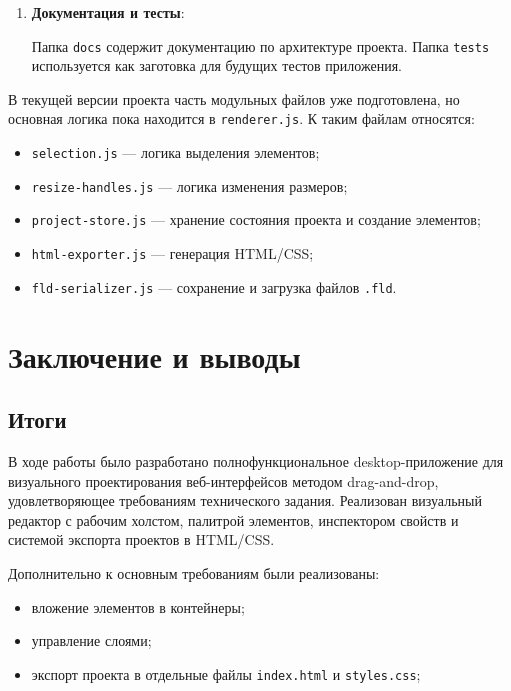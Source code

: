 \documentclass[14pt,a4paper]{extarticle}
\begin{document}
{{\begin{enumerate}
    \begin{verbatim}
{
  version: 1,
  name,
  canvas,
  elements
}
    \end{verbatim}

    При загрузке файла \texttt{.fld} элементы проходят нормализацию через функцию \texttt{normalizeElement()}. Это позволяет избежать ошибок при открытии старых сохранений после добавления новых свойств элементов.

    \item \textbf{Документация и тесты}:

    Папка \texttt{docs} содержит документацию по архитектуре проекта. Папка \texttt{tests} используется как заготовка для будущих тестов приложения.
\end{enumerate}

В текущей версии проекта часть модульных файлов уже подготовлена, но основная логика пока находится в \texttt{renderer.js}. К таким файлам относятся:

\begin{itemize}
    \item \texttt{selection.js} --- логика выделения элементов;
    \item \texttt{resize-handles.js} --- логика изменения размеров;
    \item \texttt{project-store.js} --- хранение состояния проекта и создание элементов;
    \item \texttt{html-exporter.js} --- генерация HTML/CSS;
    \item \texttt{fld-serializer.js} --- сохранение и загрузка файлов \texttt{.fld}.
\end{itemize}

\newpage
\section{Заключение и выводы}

\subsection{Итоги}

В ходе работы было разработано полнофункциональное desktop-приложение для визуального проектирования веб-интерфейсов методом drag-and-drop, удовлетворяющее требованиям технического задания. Реализован визуальный редактор с рабочим холстом, палитрой элементов, инспектором свойств и системой экспорта проектов в HTML/CSS.

Дополнительно к основным требованиям были реализованы:
\begin{itemize}
    \item вложение элементов в контейнеры;
    \item управление слоями;
    \item экспорт проекта в отдельные файлы \texttt{index.html} и \texttt{styles.css};
\end{itemize}

}}
\end{document}
